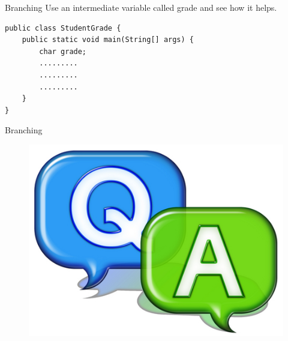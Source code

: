\documentclass[12pt]{beamer}
\begin{document}
\begin{frame}[fragile]{Branching}
 Use an intermediate variable called grade and see how it helps.
 \begin{lstlisting}[numbers=none]
public class StudentGrade {
    public static void main(String[] args) {
        char grade;
        .........
        .........
        .........
    }
}
 \end{lstlisting}

\end{frame}


\begin{frame}{Branching}
 \begin{figure}[H]
 \begin{center}
   \includegraphics[scale=.3]{qa.png}   
 \end{center}
  \end{figure}
\end{frame}
\end{document}
